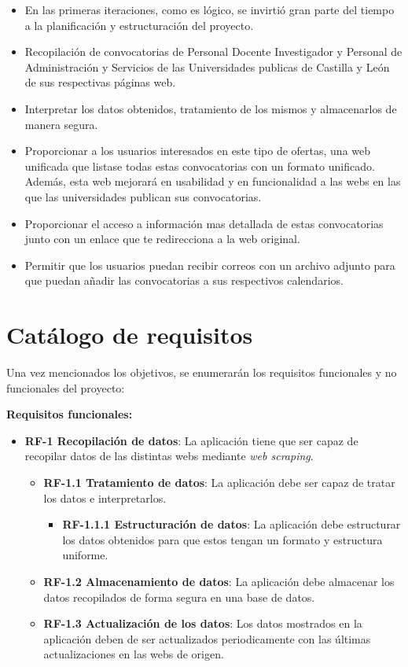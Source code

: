 \begin{itemize}
\item En las primeras iteraciones, como es lógico, se invirtió gran parte del tiempo a la planificación y estructuración del proyecto.

\item Recopilación de convocatorias de Personal Docente Investigador y Personal de Administración y Servicios de las Universidades publicas de Castilla y León de sus respectivas páginas web. 

\item Interpretar los datos obtenidos, tratamiento de los mismos y almacenarlos de manera segura.

\item Proporcionar a los usuarios interesados en este tipo de ofertas, una web unificada que listase todas estas convocatorias con un formato unificado. Además, esta web mejorará en usabilidad y en funcionalidad a las webs en las que las universidades publican sus convocatorias.

\item Proporcionar el acceso a información mas detallada de estas convocatorias junto con un enlace que te redirecciona a la web original.

\item Permitir que los usuarios puedan recibir correos con un archivo adjunto para que puedan añadir las convocatorias a sus respectivos calendarios.

\end{itemize}

\section{Catálogo de requisitos}

Una vez mencionados los objetivos, se enumerarán los requisitos funcionales y no funcionales del proyecto:

\textbf{Requisitos funcionales:}

\begin{itemize}
\item\textbf{RF-1 Recopilación de datos}: La aplicación tiene que ser capaz de recopilar datos de las distintas webs mediante \textit{web scraping}.
\begin{itemize}
\item\textbf{RF-1.1 Tratamiento de datos}: La aplicación debe ser capaz de tratar los datos e interpretarlos.
\begin{itemize}
\item\textbf{RF-1.1.1 Estructuración de datos}: La aplicación debe estructurar los datos obtenidos para que estos tengan un formato y estructura uniforme.
\end{itemize}
\item\textbf{RF-1.2 Almacenamiento de datos}: La aplicación debe almacenar los datos recopilados de forma segura en una base de datos.
\item\textbf{RF-1.3 Actualización de los datos}: Los datos mostrados en la aplicación deben de ser actualizados periodicamente con las últimas actualizaciones en las webs de origen.
\end{itemize}
\end{itemize}

